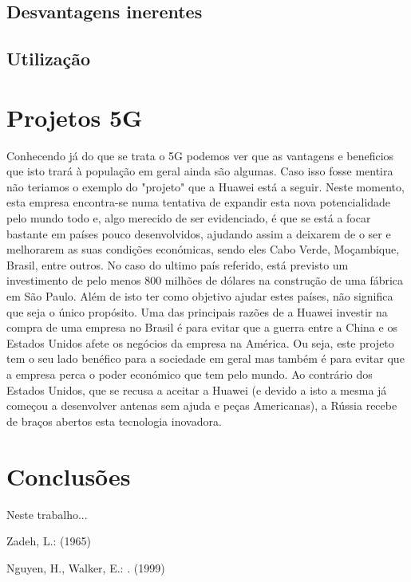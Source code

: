 \documentclass{llncs}
\begin{document}
\subsection{Desvantagens inerentes}
\subsection{Utilização}
\section{Projetos 5G}
Conhecendo já do que se trata o 5G podemos ver que as vantagens e 
beneficios que isto trará à população em geral ainda são algumas.
Caso isso fosse mentira não teriamos o exemplo do "projeto" que a
Huawei está a seguir. Neste momento, esta empresa encontra-se numa 
tentativa de expandir esta nova potencialidade pelo mundo todo e,
algo merecido de ser evidenciado, é que se está a focar bastante em
países pouco desenvolvidos, ajudando assim a deixarem de o ser e melhorarem as suas
condições económicas, sendo eles Cabo Verde, Moçambique, Brasil, entre
outros. No caso do ultimo país referido, está previsto um investimento
de pelo menos 800 milhões de dólares na construção de uma fábrica em 
São Paulo. Além de isto ter como objetivo ajudar estes países, não significa 
que seja o único propósito. Uma das principais razões de a Huawei investir na compra
de uma empresa no Brasil é para evitar que a guerra entre a China e os Estados Unidos
afete os negócios da empresa na América. Ou seja, este projeto tem o seu lado benéfico
para a sociedade em geral mas também é para evitar que a empresa perca o poder económico
que tem pelo mundo.
Ao contrário dos Estados Unidos, que se recusa a aceitar a Huawei (e devido a isto
a mesma já começou a desenvolver antenas sem ajuda e peças Americanas), a Rússia recebe de braços
abertos esta tecnologia inovadora.
\section{Conclusões}

Neste trabalho...

%

\begin{thebibliography}{1}
Zadeh, L.:
 (1965)

Nguyen, H., Walker, E.:
.
 (1999)
\end{thebibliography}
\end{document}
